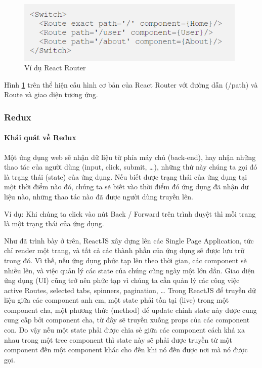 \begin{figure}[H]
\centering
\includegraphics[width=11cm]{images/react-router.png}
\caption{Ví dụ React Router}
\label{fig:reactrouter}
\end{figure}

Hình \ref{fig:reactrouter} trên thể hiện cấu hình 
cơ bản của React Router với
đường dẫn (/path) và Route và giao diện tương ứng.

\subsubsection{Redux}
\paragraph{Khái quát về Redux}
Một ứng dụng web sẽ nhận dữ liệu từ phía máy chủ (back-end),
hay nhận những thao tác của người dùng (input, click, submit, …),
những thứ này chúng ta gọi đó là trạng thái (state) của ứng dụng.
Nếu biết được trạng thái của ứng dụng tại một thời điểm nào đó,
chúng ta sẽ biết vào thời điểm đó ứng dụng đã nhận dữ liệu nào,
những thao tác nào đã được người dùng truyền lên.

Ví dụ: Khi chúng ta click vào nút Back / Forward trên trình duyệt 
thì mỗi trang là một trạng thái của ứng dụng.

Như đã trình bày ở trên, ReactJS xây dựng lên các Single
Page Application, tức chỉ render một trang, và tất cả các
thành phần của ứng dụng sẽ được lưu trữ trong đó. Vì thế,
nếu ứng dụng phức tạp lên theo thời gian, các component sẽ nhiều
lên, và việc quản lý các state của chúng cũng ngày một lớn dần.
Giao diện ứng dụng (UI) cũng trở nên phức tạp vì chúng ta
cần quản lý các công việc active Routes, selected tabs, spinners,
pagination, … Trong ReactJS để truyền dữ liệu giữa các component anh
em, một state phải tồn tại (live) trong một component cha,
một phương thức (method) để update chính state này được cung cung
cấp bởi component cha, từ đây sẽ truyền xuống props của các
component con. Do vậy nếu một state phải được chia sẻ giữa các
component cách khá xa nhau trong một tree component thì state
này sẽ phải được truyền từ một component đến một component khác cho
đến khi nó đến được nơi mà nó được gọi.

